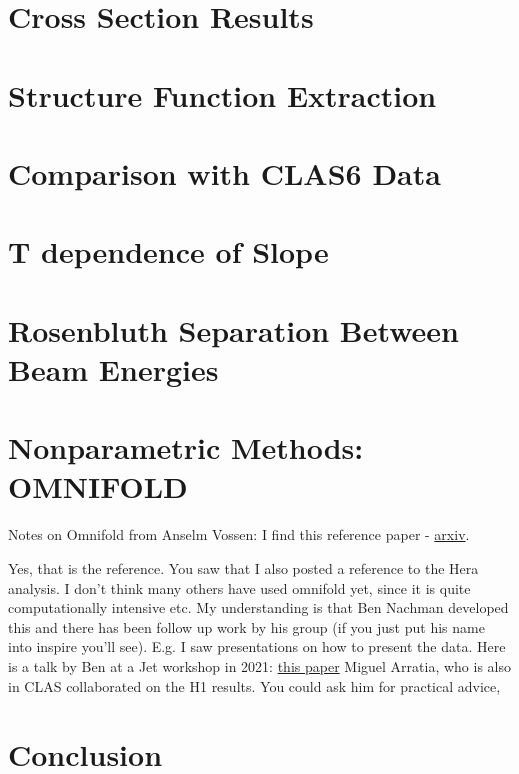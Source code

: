 \section{Cross Section Results}
    
    
\section{Structure Function Extraction}

\section{Comparison with CLAS6 Data}
\section{T dependence of Slope}





\section{Rosenbluth Separation Between Beam Energies}
\section{Nonparametric Methods: OMNIFOLD}
Notes on Omnifold from Anselm Vossen:
I find this reference paper - \href{https://arxiv.org/pdf/1911.09107.pdf}{arxiv}.




Yes, that is the reference. You saw that I also posted a reference to the Hera analysis. I don’t think many others have used omnifold yet, since it is quite computationally intensive etc.
My understanding is that Ben Nachman developed this and there has been follow up work by his group (if you just put his name into inspire you’ll see). E.g. I saw presentations on how to present the data. Here is a talk by Ben at a Jet workshop in 2021: \href{https://indico.bnl.gov/event/10555/contributions/54721/attachments/37368/61570/H1Measurement_EICWorkshopSeptember2021.pdf}{this paper}
 Miguel Arratia, who is also in CLAS collaborated on the H1 results. You could ask him for practical advice,




\section{Conclusion}